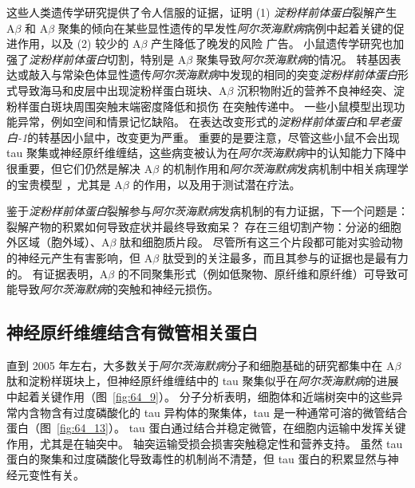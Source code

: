 这些人类遗传学研究提供了令人信服的证据，证明 (1) \textit{淀粉样前体蛋白}裂解产生 A$\beta$ 和 A$\beta$ 聚集的倾向在某些显性遗传的早发性\textit{阿尔茨海默病}病例中起着关键的促进作用，以及 (2) 较少的 A$\beta$ 产生降低了晚发的风险 广告。
小鼠遗传学研究也加强了\textit{淀粉样前体蛋白}切割，特别是 A$\beta$ 聚集导致\textit{阿尔茨海默病}的情况。
转基因表达或敲入与常染色体显性遗传\textit{阿尔茨海默病}中发现的相同的突变\textit{淀粉样前体蛋白}形式导致海马和皮层中出现淀粉样蛋白斑块、A$\beta$ 沉积物附近的营养不良神经突、淀粉样蛋白斑块周围突触末端密度降低和损伤 在突触传递中。
一些小鼠模型出现功能异常，例如空间和情景记忆缺陷。
在表达改变形式的\textit{淀粉样前体蛋白}和\textit{早老蛋白-1}的转基因小鼠中，改变更为严重。
重要的是要注意，尽管这些小鼠不会出现 tau 聚集或神经原纤维缠结，这些病变被认为在\textit{阿尔茨海默病}中的认知能力下降中很重要，但它们仍然是解决 A$\beta$ 的机制作用和\textit{阿尔茨海默病}发病机制中相关病理学的宝贵模型 ，尤其是 A$\beta$ 的作用，以及用于测试潜在疗法。


鉴于\textit{淀粉样前体蛋白}裂解参与\textit{阿尔茨海默病}发病机制的有力证据，下一个问题是：
裂解产物的积累如何导致症状并最终导致痴呆？
存在三组切割产物：分泌的细胞外区域（胞外域）、A$\beta$ 肽和细胞质片段。
尽管所有这三个片段都可能对实验动物的神经元产生有害影响，但 A$\beta$ 肽受到的关注最多，而且其参与的证据也是最有力的。
有证据表明，A$\beta$ 的不同聚集形式（例如低聚物、原纤维和原纤维）可导致可能导致\textit{阿尔茨海默病}的突触和神经元损伤。



\subsection{神经原纤维缠结含有微管相关蛋白}

直到 2005 年左右，大多数关于\textit{阿尔茨海默病}分子和细胞基础的研究都集中在 A$\beta$ 肽和淀粉样斑块上，但神经原纤维缠结中的 tau 聚集似乎在\textit{阿尔茨海默病}的进展中起着关键作用（图~\ref{fig:64_9}）。
分子分析表明，细胞体和近端树突中的这些异常内含物含有过度磷酸化的 tau 异构体的聚集体，tau 是一种通常可溶的微管结合蛋白（图~\ref{fig:64_13}）。
tau 蛋白通过结合并稳定微管，在细胞内运输中发挥关键作用，尤其是在轴突中。
轴突运输受损会损害突触稳定性和营养支持。
虽然 tau 蛋白的聚集和过度磷酸化导致毒性的机制尚不清楚，但 tau 蛋白的积累显然与神经元变性有关。



